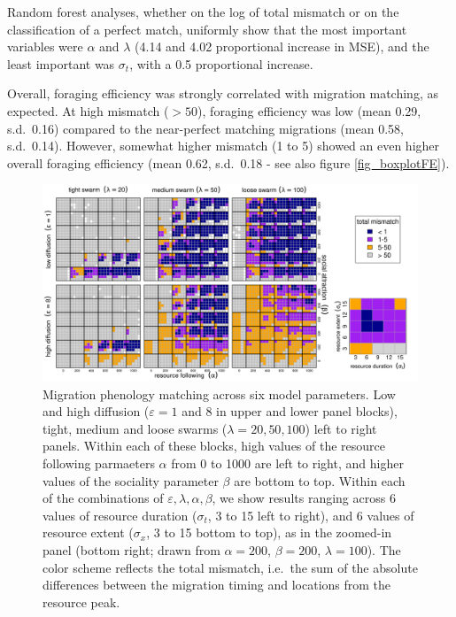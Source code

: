 \documentclass[utf8]{frontiersSCNS} %
\begin{document}
	Random forest analyses, whether on the log of total mismatch or on the classification of a perfect match, uniformly show that the most important variables \citep{Breiman2001} were $\alpha$ and $\lambda$ (4.14 and 4.02 proportional increase in MSE), and the least important was $\sigma_t$, with a 0.5 proportional increase.
	
	Overall, foraging efficiency was strongly correlated with migration matching, as expected. At high mismatch ($>50$), foraging efficiency was low (mean 0.29, s.d.~0.16) compared to the near-perfect matching migrations (mean 0.58, s.d.~0.14). However, somewhat higher mismatch (1 to 5) showed an even higher overall foraging efficiency (mean 0.62, s.d.~0.18 - see also figure \ref{fig_boxplotFE}).
	
	\begin{figure}
		\includegraphics[width = \textwidth]{figures/StabilityResults.png} 
		\caption{\label{fig_phenologymatching} Migration phenology matching across six model parameters. Low and high diffusion ($\varepsilon = 1$ and $8$ in upper and lower panel blocks), tight, medium and loose swarms ($\lambda = 20, 50, 100$) left to right panels. Within each of these blocks, high values of the resource following parmaeters $\alpha$ from 0 to 1000 are left to right, and higher values of the sociality parameter $\beta$ are bottom to top. Within each of the combinations of $\varepsilon, \lambda, \alpha, \beta$, we show results ranging across 6 values of resource duration ($\sigma_t$, 3 to 15 left to right), and 6 values of resource extent ($\sigma_x$, 3 to 15 bottom to top), as in the zoomed-in panel (bottom right; drawn from $\alpha = 200$, $\beta = 200$, $\lambda = 100$). The color scheme reflects the total mismatch, i.e.~the sum of the absolute differences between the migration timing and locations from the resource peak.}
	\end{figure}
	
\end{document}

